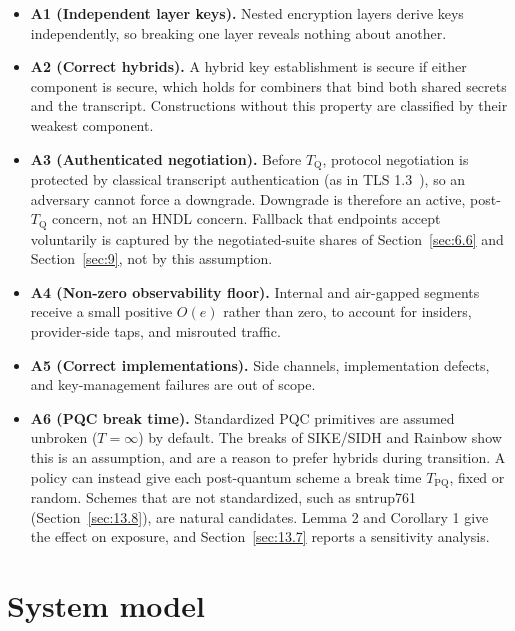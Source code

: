 \documentclass[conference]{IEEEtran}
\newcommand{\Tq}{T_{\mathrm{Q}}}
\begin{document}
\begin{itemize}
\item \textbf{A1 (Independent layer keys).} Nested encryption layers derive keys independently, so breaking one layer reveals nothing about another.
\item \textbf{A2 (Correct hybrids).} A hybrid key establishment is secure if either component is secure, which holds for combiners that bind both shared secrets and the transcript. Constructions without this property are classified by their weakest component.
\item \textbf{A3 (Authenticated negotiation).} Before $\Tq$, protocol negotiation is protected by classical transcript authentication (as in TLS 1.3~\cite{rescorla2018}), so an adversary cannot force a downgrade. Downgrade is therefore an active, post-$\Tq$ concern, not an HNDL concern. Fallback that endpoints accept voluntarily is captured by the negotiated-suite shares of Section~\ref{sec:6.6} and Section~\ref{sec:9}, not by this assumption.
\item \textbf{A4 (Non-zero observability floor).} Internal and air-gapped segments receive a small positive $O(e)$ rather than zero, to account for insiders, provider-side taps, and misrouted traffic.
\item \textbf{A5 (Correct implementations).} Side channels, implementation defects, and key-management failures are out of scope.
\item \textbf{A6 (PQC break time).} Standardized PQC primitives are assumed unbroken ($T = \infty$) by default. The breaks of SIKE/SIDH \cite{castryck2023} and Rainbow \cite{beullens2022} show this is an assumption, and are a reason to prefer hybrids during transition. A policy can instead give each post-quantum scheme a break time $T_{\mathrm{PQ}}$, fixed or random. Schemes that are not standardized, such as sntrup761 (Section~\ref{sec:13.8}), are natural candidates. Lemma 2 and Corollary 1 give the effect on exposure, and Section~\ref{sec:13.7} reports a sensitivity analysis.
\end{itemize}

\section{System model}\label{sec:4}
\end{document}
